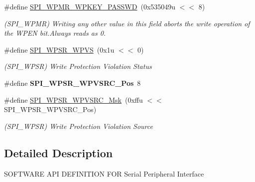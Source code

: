 \begin{DoxyCompactItemize}
\item 
\mbox{\label{group__SAMS70__SPI_gad5eacda218874e9f160526fd09b840f7}} 
\#define \mbox{\hyperlink{group__SAMS70__SPI_gad5eacda218874e9f160526fd09b840f7}{S\+P\+I\+\_\+\+W\+P\+M\+R\+\_\+\+W\+P\+K\+E\+Y\+\_\+\+P\+A\+S\+S\+WD}}~(0x535049u $<$$<$ 8)
\begin{DoxyCompactList}\small\item\em (S\+P\+I\+\_\+\+W\+P\+MR) Writing any other value in this field aborts the write operation of the W\+P\+EN bit.\+Always reads as 0. \end{DoxyCompactList}\item 
\mbox{\label{group__SAMS70__SPI_ga2fdfc086344d7f94c78b3411f9300ff6}} 
\#define \mbox{\hyperlink{group__SAMS70__SPI_ga2fdfc086344d7f94c78b3411f9300ff6}{S\+P\+I\+\_\+\+W\+P\+S\+R\+\_\+\+W\+P\+VS}}~(0x1u $<$$<$ 0)
\begin{DoxyCompactList}\small\item\em (S\+P\+I\+\_\+\+W\+P\+SR) Write Protection Violation Status \end{DoxyCompactList}\item 
\mbox{\label{group__SAMS70__SPI_gab5938ab029cbff7d33f85030efee59a1}} 
\#define {\bfseries S\+P\+I\+\_\+\+W\+P\+S\+R\+\_\+\+W\+P\+V\+S\+R\+C\+\_\+\+Pos}~8
\item 
\mbox{\label{group__SAMS70__SPI_ga85243137e58ab2f2dfe757f0d5847744}} 
\#define \mbox{\hyperlink{group__SAMS70__SPI_ga85243137e58ab2f2dfe757f0d5847744}{S\+P\+I\+\_\+\+W\+P\+S\+R\+\_\+\+W\+P\+V\+S\+R\+C\+\_\+\+Msk}}~(0xffu $<$$<$ S\+P\+I\+\_\+\+W\+P\+S\+R\+\_\+\+W\+P\+V\+S\+R\+C\+\_\+\+Pos)
\begin{DoxyCompactList}\small\item\em (S\+P\+I\+\_\+\+W\+P\+SR) Write Protection Violation Source \end{DoxyCompactList}\end{DoxyCompactItemize}


\subsection{Detailed Description}
S\+O\+F\+T\+W\+A\+RE A\+PI D\+E\+F\+I\+N\+I\+T\+I\+ON F\+OR Serial Peripheral Interface 